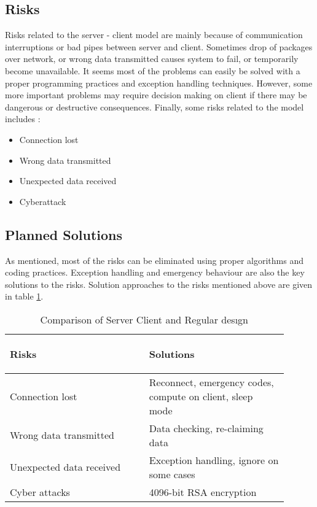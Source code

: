 \subsection{Risks}
Risks related to the server - client model are mainly because of communication interruptions or bad pipes between server and client. Sometimes drop of packages over network, or wrong data transmitted causes system to fail, or temporarily become unavailable. It seems most of the problems can easily be solved with a proper programming practices and exception handling techniques. However, some more important problems may require decision making on client if there may be dangerous or destructive consequences. Finally, some risks related to the model includes :

\begin{itemize}
    \item Connection lost
    \item Wrong data transmitted
    \item Unexpected data received
    \item Cyberattack
\end{itemize}


\subsection{Planned Solutions}
As mentioned, most of the risks can be eliminated using proper algorithms and coding practices. Exception handling and emergency behaviour are also the key solutions to the risks. Solution approaches to the risks mentioned above are given in table \ref{table:risksSolutions}.


\begin{table}[h!]
\begin{tabular}{|p{0.45\linewidth}|p{0.45\linewidth}|}
\begin{center}
Risks
\end{center}
&
\begin{center}
Solutions
\end{center}\\

\hline
Connection lost & Reconnect, emergency codes, compute on client, sleep mode\\
\hline
Wrong data transmitted & Data checking, re-claiming data\\
\hline
Unexpected data received & Exception handling, ignore on some cases\\
\hline
Cyber attacks & 4096-bit RSA encryption\\
\hline

\end{tabular}
\caption{Comparison of Server Client and Regular desıgn}
\label{table:risksSolutions}
\end{table}

